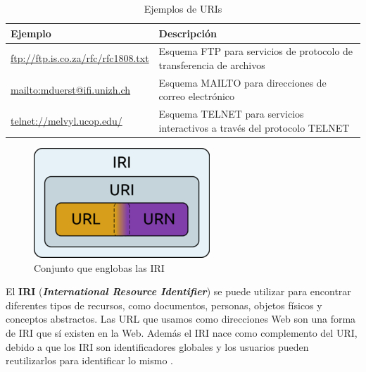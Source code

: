 \begin{table}[H]
	\caption{Ejemplos de URIs}
	\label{uris}
	\centering
	\begin{tabular}{|m{5.6cm}|m{5.6cm}|}
		\rowcolor[HTML]{EFEFEF} 
		\hline
		Ejemplo & Descripción \\ \hline
		\url{ftp://ftp.is.co.za/rfc/rfc1808.txt} & Esquema FTP para servicios de protocolo de transferencia de archivos\\ \hline
		\url{mailto:mduerst@ifi.unizh.ch} & Esquema MAILTO para direcciones de correo electrónico \\ \hline
		\url{telnet://melvyl.ucop.edu/} & Esquema TELNET para servicios interactivos a través del protocolo TELNET\\ \hline
	\end{tabular}
\end{table}

\begin{figure}[H]
	\centering
	\includegraphics[width=0.28\linewidth]{imagenes/capitulo3/URI}
	\caption{Conjunto que englobas las IRI \cite{imagen-iri}}
	\label{fig:250px-irivenndiagramm}
\end{figure}

El \textbf{IRI} (\textit{\textbf{International Resource Identifier}}) se puede utilizar para encontrar diferentes tipos de recursos, como documentos, personas, objetos físicos y conceptos abstractos. Las URL que usamos como direcciones Web son una forma de IRI que sí existen en la Web. Además el IRI nace como complemento del URI, debido a que los IRI son identificadores globales y los usuarios pueden reutilizarlos para identificar lo mismo \cite{libro-gis}.







